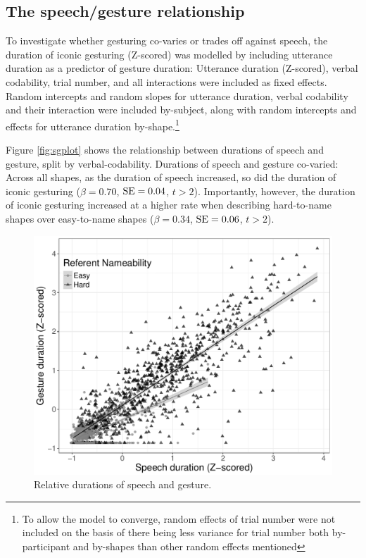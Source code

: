 \documentclass[a4paper,man,natbib]{apa6}
\newcommand{\resultsLM}[3]{$\beta = #1$, $\textnormal{SE} = #2$, $t #3$}
\begin{document}
\subsection{The speech/gesture relationship}
To investigate whether gesturing co-varies or trades off against speech, the duration of iconic gesturing (Z-scored) was modelled by including utterance duration as a predictor of gesture duration: Utterance duration (Z-scored), verbal codability, trial number, and all interactions were included as fixed effects. 
Random intercepts and random slopes for utterance duration, verbal codability and their interaction were included by-subject, along with random intercepts and effects for utterance duration by-shape.\footnote{To allow the model to converge, random effects of trial number were not included on the basis of there being less variance for trial number both by-participant and by-shapes than other random effects mentioned}

Figure \ref{fig:sgplot} shows the relationship between durations of speech and gesture, split by verbal-codability.
Durations of speech and gesture co-varied: Across all shapes, as the duration of speech increased, so did the duration of iconic gesturing (\resultsLM{0.70}{0.04}{>2}).
Importantly, however, the duration of iconic gesturing increased at a higher rate when describing hard-to-name shapes over easy-to-name shapes (\resultsLM{0.34}{0.06}{>2}).


\begin{figure}
  \centering
	\includegraphics[width=\linewidth]{sgplot.pdf}
  \caption{Relative durations of speech and gesture.}
  \label{fig:gtypes}
\end{figure}
\end{document}
